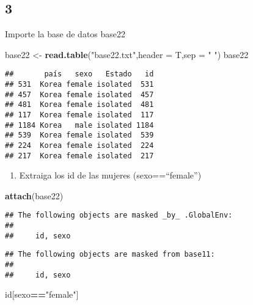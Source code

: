 \documentclass[]{article}
\newenvironment{Shaded}{\begin{snugshade}}{\end{snugshade}}
\newcommand{\KeywordTok}[1]{\textcolor[rgb]{0.13,0.29,0.53}{\textbf{#1}}}
\newcommand{\DataTypeTok}[1]{\textcolor[rgb]{0.13,0.29,0.53}{#1}}
\newcommand{\StringTok}[1]{\textcolor[rgb]{0.31,0.60,0.02}{#1}}
\newcommand{\OperatorTok}[1]{\textcolor[rgb]{0.81,0.36,0.00}{\textbf{#1}}}
\newcommand{\NormalTok}[1]{#1}
\providecommand{\tightlist}{%
  \setlength{\itemsep}{0pt}\setlength{\parskip}{0pt}}
\begin{document}
\subsection{3}\label{section-2}

Importe la base de datos base22

\begin{Shaded}
\begin{Highlighting}[]
\NormalTok{base22 <-}\StringTok{ }\KeywordTok{read.table}\NormalTok{(}\StringTok{"base22.txt"}\NormalTok{,}\DataTypeTok{header =}\NormalTok{ T,}\DataTypeTok{sep =} \StringTok{" "}\NormalTok{)}
\NormalTok{base22}
\end{Highlighting}
\end{Shaded}

\begin{verbatim}
##       país   sexo   Estado   id
## 531  Korea female isolated  531
## 457  Korea female isolated  457
## 481  Korea female isolated  481
## 117  Korea female isolated  117
## 1184 Korea   male isolated 1184
## 539  Korea female isolated  539
## 224  Korea female isolated  224
## 217  Korea female isolated  217
\end{verbatim}

\begin{enumerate}
\def\labelenumi{\alph{enumi}.}
\tightlist
\item
  Extraiga los id de las mujeres (sexo==``female'')
\end{enumerate}

\begin{Shaded}
\begin{Highlighting}[]
\KeywordTok{attach}\NormalTok{(base22)}
\end{Highlighting}
\end{Shaded}

\begin{verbatim}
## The following objects are masked _by_ .GlobalEnv:
## 
##     id, sexo
\end{verbatim}

\begin{verbatim}
## The following objects are masked from base11:
## 
##     id, sexo
\end{verbatim}

\begin{Shaded}
\begin{Highlighting}[]
\NormalTok{id[sexo}\OperatorTok{==}\StringTok{"female"}\NormalTok{]}
\end{Highlighting}
\end{Shaded}
\end{document}
